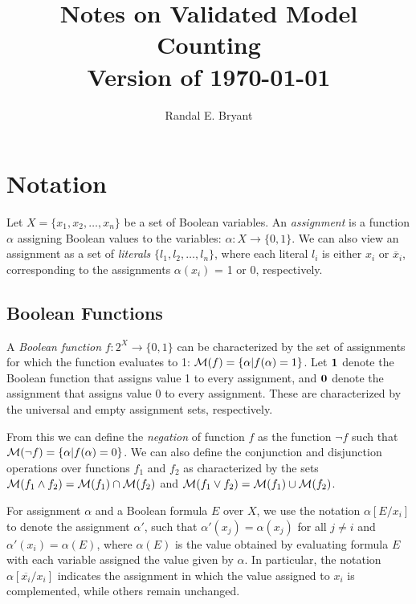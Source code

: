 \documentclass{llncs}
\title{Notes on Validated Model Counting \\ Version of \today}
\author{Randal E. Bryant}
\institute{
Computer Science Department \\
Carnegie Mellon University, Pittsburgh, PA, United States
}
\newcommand{\one}{\mbox{\bf 1}}
\newcommand{\zero}{\mbox{\bf 0}}
\newcommand{\booland}{\land}
\newcommand{\boolor}{\lor}
\newcommand{\boolnot}{\neg}
\newcommand{\tautology}{1}
\newcommand{\nil}{0}
\newcommand{\obar}[1]{\overline{#1}}
\newcommand{\interp}{\alpha}
\newcommand{\interpset}[1]{{\cal M}(#1)}
\newcommand{\subs}[2]{[#2/#1]}
\newcommand{\subsflip}[1]{\subs{#1}{\obar{#1}}}
\begin{document}
\maketitle

\section{Notation}

Let $X = \{x_1, x_2, \ldots, x_n\}$ be a set of Boolean variables.  An
{\em assignment} is a function $\interp$ assigning Boolean values to
the variables: $\interp:X \rightarrow \{\nil, \tautology\}$.  We can
also view an assignment as a set of {\em literals} $\{l_1, l_2,
\ldots, l_n\}$, where each literal $l_i$ is either $x_i$ or
$\obar{x}_i$, corresponding to the assignments $\interp(x_i)$ = 1 or 0,
respectively.

\subsection{Boolean Functions}

A {\em Boolean function} $f:2^X \rightarrow \{0,1\}$ can be
characterized by the set of assignments for which the function
evaluates to 1: $\interpset{f} = \{ \interp | f(\interp) = 1\}$.  Let
$\one$ denote the Boolean function that assigns value 1 to every
assignment, and $\zero$ denote the assignment that assigns value 0 to
every assignment.  These are characterized by the universal and empty
assignment sets, respectively.


From
this we can define the {\em negation} of function $f$ as the function
$\boolnot f$ such that
$\interpset{\boolnot f} = \{ \interp | f(\interp) = 0\}$.
We can also define the conjunction and disjunction operations over functions $f_1$ and $f_2$ as characterized by the sets
$\interpset{f_1 \booland f_2} = \interpset{f_1} \cap \interpset{f_2}$ and
$\interpset{f_1 \boolor f_2} = \interpset{f_1} \cup \interpset{f_2}$.

For assignment $\interp$ and a Boolean formula $E$ over $X$, we
use the notation $\interp\subs{x_i}{E}$ to denote the assignment
$\interp'$, such that $\interp'(x_j) = \interp(x_j)$ for all $j \not = i$
and $\interp'(x_i) = \interp(E)$, where $\interp(E)$ is the value obtained by evaluating formula $E$ with each variable assigned the value given by $\interp$.
In particular, the notation
$\interp\subsflip{x_i}$ indicates the assignment in which the value
assigned to $x_i$ is complemented, while others remain unchanged.
\end{document}
